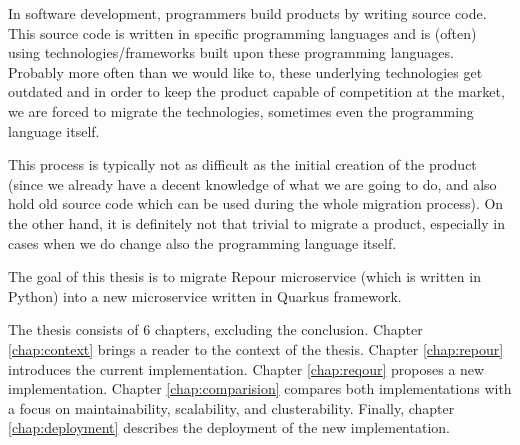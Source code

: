 \documentclass[../../main.tex]{subfiles}
\begin{document}
In software development, programmers build products by writing source code. This source code is written in specific programming languages and is (often) using technologies/frameworks built upon these programming languages. Probably more often than we would like to, these underlying technologies get outdated and in order to keep the product capable of competition at the market, we are forced to migrate the technologies, sometimes even the programming language itself.

This process is typically not as difficult as the initial creation of the product (since we already have a decent knowledge of what we are going to do, and also hold old source code which can be used during the whole migration process). On the other hand, it is definitely not that trivial to migrate a product, especially in cases when we do change also the programming language itself.

The goal of this thesis is to migrate Repour microservice (which is written in Python) into a new microservice written in Quarkus framework.

The thesis consists of 6 chapters, excluding the conclusion. Chapter \ref{chap:context} brings a reader to the context of the thesis. Chapter \ref{chap:repour} introduces the current implementation. Chapter \ref{chap:reqour} proposes a new implementation. Chapter \ref{chap:comparision} compares both implementations with a focus on maintainability, scalability, and clusterability. Finally, chapter \ref{chap:deployment} describes the deployment of the new implementation.
\end{document}
